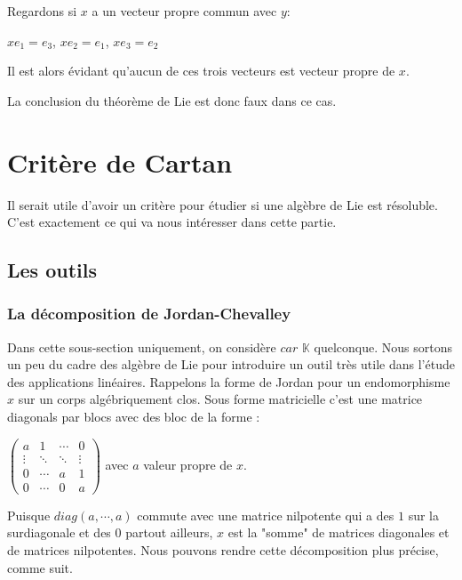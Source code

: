 \documentclass[a4paper,openany,12pt]{report}
\newcommand{\KK}{\mathbb{K}}
\theoremstyle{break}
{\theorembodyfont{\upshape}
\newtheorem*{rmq}{Remarque :}
\newtheorem*{prv}{Preuve :}
\newtheorem*{ex}{Exemples :}
\newtheorem*{exe}{Exemple : }
\newtheorem*{nota}{Notation :}
\newtheorem*{dem}{D\'emonstration :}}
\begin{document}
\begin{exe}
Regardons si $x$ a un vecteur propre commun avec $y$:
\begin{center}
$xe_1 = e_3$, \quad $xe_2=e_1$, \quad $xe_3=e_2$
\end{center}

Il est alors évidant qu'aucun de ces trois vecteurs est vecteur propre de $x$. 

La conclusion du théorème de Lie est donc faux dans ce cas. 
\end{exe}

\chapter{Critère de Cartan}

Il serait utile d'avoir un critère pour étudier si une algèbre de Lie est résoluble. C'est exactement ce qui va nous intéresser dans cette partie. 

\section{Les outils}

\subsection{La décomposition de Jordan-Chevalley}

Dans cette sous-section uniquement, on considère $car$ $\KK$ quelconque. Nous sortons un peu du cadre des algèbre de Lie pour introduire un outil très utile dans l’étude des applications linéaires. Rappelons la forme de Jordan pour un endomorphisme $x$ sur un corps algébriquement clos. Sous forme matricielle c'est une matrice diagonals par blocs avec des bloc de la forme :
\begin{center}
$
\begin{pmatrix}
a & 1 & \cdots & 0 \\
\vdots & \ddots & \ddots & \vdots \\
 0 & \cdots & a & 1 \\
0 & \cdots & 0 & a
\end{pmatrix}
$ avec $a$ valeur propre de $x$.
\end{center}

Puisque $diag(a, \cdots, a)$ commute avec une matrice nilpotente qui a des $1$ sur la surdiagonale et des $0$ partout ailleurs, $x$ est la "somme" de matrices diagonales et de matrices nilpotentes. Nous pouvons rendre cette décomposition plus précise, comme suit. 
\end{document}

